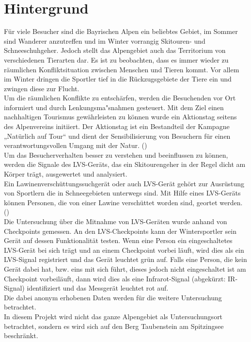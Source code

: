 \documentclass[12pt]{scrreprt}
\begin{document}
\chapter{Hintergrund}

Für viele Besucher sind die Bayrischen Alpen ein beliebtes Gebiet, im Sommer sind Wanderer anzutreffen und im Winter vorrangig Skitouren- und Schneeschuhgeher. Jedoch stellt das Alpengebiet auch das Territorium von verschiedenen Tierarten dar. Es ist zu beobachten, dass es immer wieder zu räumlichen Konfliktsituation zwischen Menschen und Tieren kommt. Vor allem im Winter dringen die Sportler tief in die Rückzugsgebiete der Tiere ein und zwingen diese zur Flucht. \\
Um die räumlichen Konflikte zu entschärfen, werden die Besuchenden vor Ort informiert und durch Lenkungsma"snahmen gesteuert. Mit dem Ziel einen nachhaltigen Tourismus gewährleisten zu können wurde ein Aktionstag seitens des Alpenvereins initiiert. Der Aktionstag ist ein Bestandteil der Kampagne „Natürlich auf Tour“ und dient der Sensibilisierung von Besuchern für einen verantwortungsvollen Umgang mit der Natur. 
(\cite{Alpenverein}) \\
Um das Besucherverhalten besser zu verstehen und beeinflussen zu können, werden die Signale des LVS-Geräts, das ein Skitourengeher in der Regel dicht am Körper trägt, ausgewertet und analysiert. \\
Ein Lawinenverschüttungssuchgerät oder auch LVS-Gerät gehört zur Ausrüstung von Sportlern die in Schneegebieten unterwegs sind. Mit Hilfe eines LVS-Geräts können Personen, die von einer Lawine verschüttet worden sind, geortet werden. (\cite{schweizerlawinen}) \\
Die Untersuchung über die Mitnahme von LVS-Geräten wurde anhand von Checkpoints gemessen. An den LVS-Checkpoints kann der Wintersportler sein Gerät auf dessen Funktionalität testen. Wenn eine Person ein eingeschaltetes LVS-Gerät bei sich trägt und an einem Checkpoint vorbei läuft, wird dies als ein LVS-Signal registriert und das Gerät leuchtet grün auf. Falls eine Person, die kein Gerät dabei hat, bzw. eins mit sich führt, dieses jedoch nicht eingeschaltet ist am Checkpoint vorbeiläuft, dann wird dies als eine Infrarot-Signal (abgekürzt: IR-Signal) identifiziert und das Messgerät leuchtet rot auf. \\
Die dabei anonym erhobenen Daten werden für die weitere Untersuchung betrachtet. \\
In diesem Projekt wird nicht das ganze Alpengebiet als Untersuchungsort betrachtet, sondern es wird sich auf den Berg Taubenstein am Spitzingsee beschränkt. \\
\end{document}
